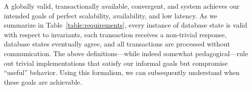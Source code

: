  A globally valid, transactionally available,
convergent, and \cfree system achieves our intended goals of perfect
scalability, availability, and low latency. As we summarize in
Table~\ref{table:requirements}, every instance of database state is
valid with respect to invariants, each transaction receives a
non-trivial response, database states eventually agree, and all
transactions are processed without communication. The above
definitions---while indeed somewhat pedagogical---rule out trivial
implementations that satisfy our informal goals but compromise
``useful'' behavior. Using this formalism, we can subsequently
understand when these goals are achievable.
